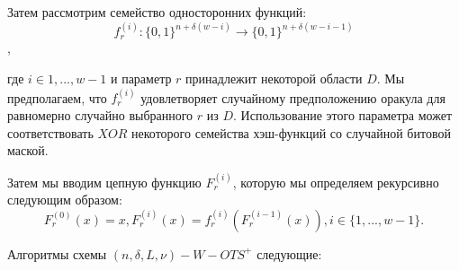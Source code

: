 \documentclass[a4paper, 14pt]{extarticle}
\begin{document}
Затем рассмотрим семейство односторонних функций:
\[ f^{(i)}_{r} : \{0,1\}^{n+\delta(w - i)} \rightarrow \{0,1\}^{n+\delta(w - i - 1)} \],

где $i \in {1, ..., w - 1}$ и параметр $r$ принадлежит некоторой области $D$. Мы предполагаем, что $f^{(i)}_{r}$ удовлетворяет случайному предположению оракула для равномерно случайно выбранного $r$ из $D$. Использование этого параметра может соответствовать $XOR$ некоторого семейства хэш-функций со случайной битовой маской.

Затем мы вводим цепную функцию $F^{(i)}_{r}$, которую мы определяем рекурсивно следующим образом:
\[F^{(0)}_{r}(x) = x, F^{(i)}_{r}(x) = f^{(i)}_{r}(F^{(i - 1)}_{r}(x)), i \in \{1, ..., w - 1\}.\]

Алгоритмы схемы $(n, \delta, L, \nu)-W-OTS^{+}$ следующие:
\end{document}
